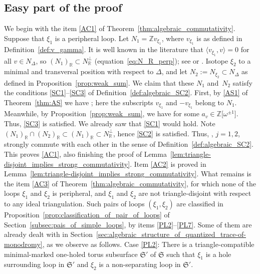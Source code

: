 \documentclass[pdftex]{sigma}
\numberwithin{equation}{section}
\theoremstyle{definition}
\begin{document}
\subsection{Easy part of the proof}\label{subsec:easy_part}
We begin with the item \ref{AC1} of Theorem~\ref{thm:algebraic_commutativity}.
Suppose that $\xi_1$ is a peripheral loop. Let $N_1 = \mathbb{Z} v_{\xi_1}$, where $v_{\xi_1}$ is as defined in Definition~\ref{def:v_gamma}. It is well known in the literature that $\langle v_{\xi_1}, v\rangle=0$ for all $v\in N_\Delta$, so $(N_1)_\mathbb{R} \subset N_\mathbb{R}^\perp$ (equation~\eqref{eq:N_R_perp}); see \cite[Lemma~8]{BL07} or \cite[Lemma~3.9]{AK}. Isotope $\xi_2$ to a minimal and transversal position with respect to $\Delta$, and let $N_2 := N_{\xi_2} \subset N_\Delta$ as defined in Proposition~\ref{prop:weak_sum}. We claim that these $N_1$ and~$N_2$ satisfy the conditions \ref{SC1}--\ref{SC3} of Definition~\ref{def:algebraic_SC2}. First, by \ref{AS1} of Theorem~\ref{thm:AS} we have ; here the subscripts $v_{\xi_1}$ and $-v_{\xi_1}$ belong to $N_1$. Meanwhile, by Proposition~\ref{prop:weak_sum}, we have  for some $a_v\in \mathbb{Z}\bigl[\omega^{\pm 1}\bigr]$. Thus, \ref{SC3} is satisfied. We already saw that \ref{SC1} would hold. Note $(N_1)_\mathbb{R} \cap (N_2)_\mathbb{R} \subset (N_1)_\mathbb{R} \subset N_\mathbb{R}^\perp$, hence \ref{SC2} is satisfied. Thus, , $j=1,2$, strongly commute with each other in the sense of Definition~\ref{def:algebraic_SC2}. This proves \ref{AC1}, also finishing the proof of Lemma~\ref{lem:triangle-disjoint_implies_strong_commutativity}.
Item \ref{AC2} is proved in Lemma~\ref{lem:triangle-disjoint_implies_strong_commutativity}.
What remains is the item \ref{AC3} of Theorem~\ref{thm:algebraic_commutativity}, for which none of the loops $\xi_1$ and $\xi_2$ is peripheral, and $\xi_1$ and $\xi_2$ are not triangle-disjoint with respect to any ideal triangulation. Such pairs of loops $(\xi_1,\xi_2)$ are classified in Proposition~\ref{prop:classification_of_pair_of_loops} of Section~\ref{subsec:pais_of_simple_loops}, by items \ref{PL2}--\ref{PL7}. Some of them are already dealt with in Section~\ref{sec:algebraic_structure_of_quantized_trace-of-monodromy}, as we observe as follows.
Case {\ref{PL2}}: There is a triangle-compatible minimal-marked one-holed torus subsurface $\mathfrak{S}'$ of $\mathfrak{S}$ such that $\xi_1$ is a hole surrounding loop in $\mathfrak{S}'$ and $\xi_2$ is a non-separating loop in $\mathfrak{S}'$.
\end{document}
